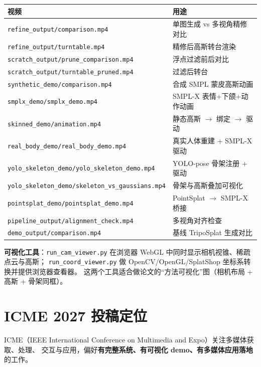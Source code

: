 \documentclass[11pt]{article}
\begin{document}
\begin{center}
\begin{tabular}{@{}ll@{}}
\toprule
\textbf{视频} & \textbf{用途} \\
\midrule
\texttt{refine\_output/comparison.mp4} & 单图生成 vs 多视角精修对比 \\
\texttt{refine\_output/turntable.mp4} & 精修后高斯转台渲染 \\
\texttt{scratch\_output/prune\_comparison.mp4} & 浮点过滤前后对比 \\
\texttt{scratch\_output/turntable\_pruned.mp4} & 过滤后转台 \\
\texttt{synthetic\_demo/comparison.mp4} & 合成 SMPL 蒙皮高斯动画 \\
\texttt{smplx\_demo/smplx\_demo.mp4} & SMPL-X 表情+下颌+动作动画 \\
\texttt{skinned\_demo/animation.mp4} & 静态高斯 $\rightarrow$ 绑定 $\rightarrow$ 驱动 \\
\texttt{real\_body\_demo/real\_body\_demo.mp4} & 真实人体重建 + SMPL-X 驱动 \\
\texttt{yolo\_skeleton\_demo/yolo\_skeleton\_demo.mp4} & YOLO-pose 骨架注册 + 驱动 \\
\texttt{yolo\_skeleton\_demo/skeleton\_vs\_gaussians.mp4} & 骨架与高斯叠加可视化 \\
\texttt{pointsplat\_demo/pointsplat\_demo.mp4} & PointSplat $\rightarrow$ SMPL-X 桥接 \\
\texttt{pipeline\_output/alignment\_check.mp4} & 多视角对齐检查 \\
\texttt{demo\_output/comparison.mp4} & 基线 TripoSplat 生成对比 \\
\bottomrule
\end{tabular}
\end{center}

\textbf{可视化工具}：\texttt{run\_cam\_viewer.py} 在浏览器 WebGL 中同时显示相机视锥、稀疏点云与高斯；
\texttt{run\_coord\_viewer.py} 做 OpenCV/OpenGL/SplatShop 坐标系转换并提供浏览器查看器。
这两个工具适合做论文的``方法可视化''图（相机布局 + 高斯 + 骨架同框）。

\section{ICME 2027 投稿定位}

ICME（IEEE International Conference on Multimedia and Expo）关注多媒体获取、处理、
交互与应用，偏好\textbf{有完整系统、有可视化 demo、有多媒体应用落地}的工作。
\end{document}
